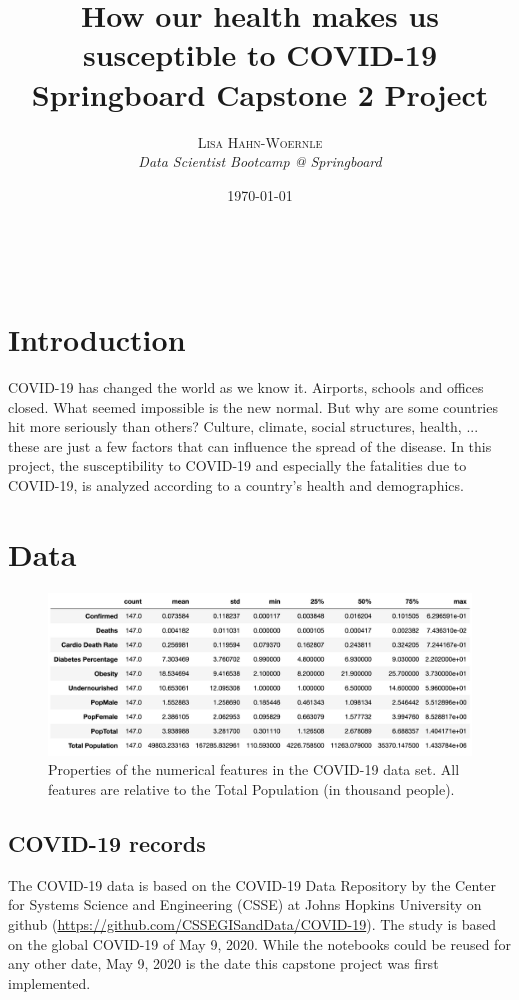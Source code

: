 \documentclass[a4paper, 11pt]{article} %
\title{\textbf{How our health makes us susceptible to COVID-19}\\ %
Springboard Capstone 2 Project} %
\author{\textsc{Lisa Hahn-Woernle} %
\\{\textit{Data Scientist Bootcamp @ Springboard}}} %
\date{\today} %
\makeatletter
\renewcommand{\maketitle}{ %
\begin{center} %
{\LARGE\@title} %

\vspace{50pt} %

{\large\@author} %
\\\@date %

\vspace{40pt} %
\end{center}
}
\makeatother
\begin{document}
\maketitle %

\section{Introduction}
COVID-19 has changed the world as we know it. Airports, schools and offices closed. What seemed impossible is the new normal. But why are some countries hit more seriously than others? Culture, climate, social structures, health, ... these are just a few factors that can influence the spread of the disease. In this project, the susceptibility to COVID-19 and especially the fatalities due to COVID-19, is analyzed according to a country's health and demographics.

\section{Data}
\begin{figure}[htbp]
   \includegraphics[width=0.9\linewidth]{figures/DataSet_Describe.png} 
   \caption{Properties of the numerical features in the COVID-19 data set. All features are relative to the Total Population (in thousand people).}
   \label{fig:Describe}
\end{figure}

\subsection{COVID-19 records}
The COVID-19 data is based on the COVID-19 Data Repository by the Center for Systems Science and Engineering (CSSE) at Johns Hopkins University on github (\url{https://github.com/CSSEGISandData/COVID-19}). The study is based on the global COVID-19 of May 9, 2020. While the notebooks could be reused for any other date, May 9, 2020 is the date this capstone project was first implemented.
\end{document}
